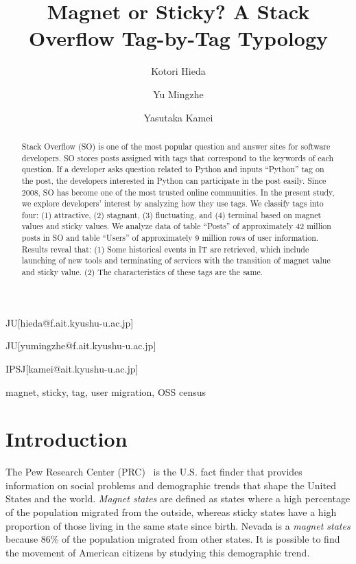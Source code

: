 \documentclass[english,preprint,JIP,technote]{ipsj}
\begin{document}
\title{Magnet or Sticky? A Stack Overflow Tag-by-Tag Typology\\}


\author{Kotori Hieda}{JU}[hieda@f.ait.kyushu-u.ac.jp]
\author{Yu Mingzhe}{JU}[yumingzhe@f.ait.kyushu-u.ac.jp]
\author{Yasutaka Kamei}{IPSJ}[kamei@ait.kyushu-u.ac.jp]

\begin{abstract}
Stack Overflow (SO) is one of the most popular question and answer sites for software developers. SO stores posts assigned with tags that correspond to the keywords of each question. If a developer asks question related to Python and inputs ``Python'' tag on the post, the developers interested in Python can participate in the post easily. Since 2008, SO has become one of the most trusted online communities. In the present study, we explore developers' interest by analyzing how they use tags. We classify tags into four: (1) attractive, (2) stagnant, (3) fluctuating, and (4) terminal based on magnet values and sticky values. We analyze data of table ``Posts'' of approximately 42 million posts in SO and table ``Users'' of approximately 9 million rows of user information. Results reveal that: 
(1) Some historical events in IT are retrieved, which include launching of new tools and terminating of services with the transition of magnet value and sticky value.
(2) The characteristics of these tags are the same.
\end{abstract}



\begin{keyword}
magnet, sticky, tag, user migration, OSS census
\end{keyword}


\maketitle

\section{Introduction}
The Pew Research Center (PRC)~\cite{communityeconomic} is the U.S. fact finder that provides information on social problems and demographic trends that shape the United States and the world. \emph{Magnet states} are defined as states where a high percentage of the population migrated from the outside, whereas sticky states have a high proportion of those living in the same state since birth. Nevada is a \emph{magnet states} because  86\% of the population migrated from other states. It is possible to find the movement of American citizens by studying this demographic trend.
\end{document}

